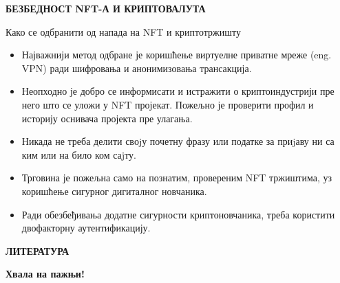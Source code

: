 \documentclass{beamer}
\begin{document}
\begin{frame}
{\large\textbf{БЕЗБЕДНОСТ NFT-А И КРИПТОВАЛУТА}}
\begin{center}
\textcolor[rgb]{0,0,0.55}{\colorbox[rgb]{0,0,1}{\textcolor[rgb]{1,1,1}{Како се одбранити од напада на NFT и криптотржишту}}}
\end{center}
 \begin{itemize}
     \item Најважнији метод одбране је коришћење виртуелне приватне мреже (eng. VPN) ради шифровања и анонимизовања трансакција.
\item Неопходно је добро се информисати и истражити о криптоиндустрији пре него што се уложи у NFT пројекат. Пожељно је проверити профил и историју оснивача пројекта пре улагања.
\item Никада не треба делити своjу почетну фразу или податке за приjаву ни са ким или на било ком саjту.
\item Трговина је пожељна само на познатим, провереним NFT тржиштима, уз коришћење сигурног дигиталног новчаника.
\item Ради обезбеђивања додатне сигурности криптоновчаника, треба користити двофакторну аутентификацију.
 \end{itemize}
    
\end{frame}
\begin{frame} 
{\large\textbf{ЛИТЕРАТУРА}}
\begin{center}


\end{center}
\end{frame} 

\begin{frame}
\begin{center}
\textcolor[rgb]{0,0,0.55}{\colorbox[rgb]{0,0,1}{\textcolor[rgb]{1,1,1}{\Huge\textbf{Хвала на пажњи!}}}}
\end{center}
\end{frame}
\end{document}
